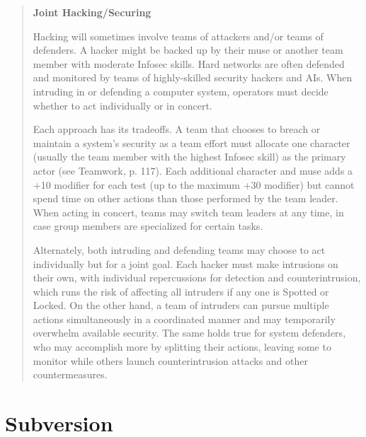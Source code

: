 \begin{quotation} \textbf{Joint Hacking/Securing} 

Hacking will sometimes involve teams of attackers and/or teams of defenders. A hacker might be backed up by their muse or another team member with moderate Infosec skills. Hard networks are often defended and monitored by teams of highly-skilled security hackers and AIs. When intruding in or defending a computer system, operators must decide whether to act individually or in concert. 

Each approach has its tradeoffs. A team that chooses to breach or maintain a system’s security as a team effort must allocate one character (usually the team member with the highest Infosec skill) as the primary actor (see Teamwork, p. 117). Each additional character and muse adds a +10 modifier for each test (up to the maximum +30 modifier) but cannot spend time on other actions than those performed by the team leader. When acting in concert, teams may switch team leaders at any time, in case group members are specialized for certain tasks. 

Alternately, both intruding and defending teams may choose to act individually but for a joint goal. Each hacker must make intrusions on their own, with individual repercussions for detection and counterintrusion, which runs the risk of affecting all intruders if any one is Spotted or Locked. On the other hand, a team of intruders can pursue multiple actions simultaneously in a coordinated manner and may temporarily overwhelm available security. The same holds true for system defenders, who may accomplish more by splitting their actions, leaving some to monitor while others launch counterintrusion attacks and other countermeasures. \end{quotation} 



\section{Subversion} 

